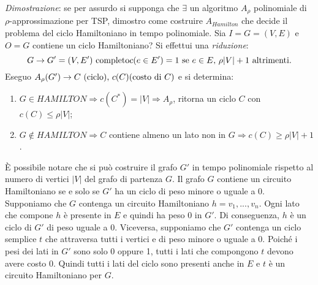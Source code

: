 \textit{Dimostrazione}: se per assurdo si supponga che $\exists$ un algoritmo $A_\rho$
polinomiale di $\rho$-approssimazione per TSP, dimostro come costruire $A_{Hamilton}$
che decide il problema del ciclo Hamiltoniano in tempo polinomiale. Sia $I = G =(V,E)$
e $O = G$ contiene un ciclo Hamiltoniano? Si effettui una \textit{riduzione}:
\[
    G \rightarrow G' = (V, E') \textnormal{ completo}
    c(e \in E') = 1 \textnormal{ se } e \in E \textnormal{, } \rho|V| + 1 \textnormal{ altrimenti.}
\]
Eseguo $A_\rho(G') \rightarrow C \textnormal{ (ciclo), } c(C) \textnormal{(costo di $C$)}$ e si
determina:
\begin{enumerate}
\item $G \in HAMILTON \Rightarrow c(C^*) = |V| \Rightarrow A_\rho$, ritorna un ciclo $C$
con $c(C) \le \rho|V|$;
\item $G \not\in HAMILTON \Rightarrow C$ contiene almeno un lato non in
$G \Rightarrow c(C) \ge \rho|V| + 1$.
\end{enumerate}

È possibile notare che si può costruire il grafo $G'$ in tempo polinomiale rispetto al numero
di vertici $|V|$ del grafo di partenza $G$. Il grafo $G$ contiene un circuito Hamiltoniano se e
solo se $G'$ ha un ciclo di peso minore o uguale a 0. Supponiamo che $G$ contenga un circuito
Hamiltoniano $h = v_1, ..., v_n$. Ogni lato che compone $h$ è presente in $E$ e quindi ha peso 0 in $G'$.
Di conseguenza, $h$ è un ciclo di $G'$ di peso uguale a 0. Viceversa, supponiamo che $G'$ contenga un ciclo
semplice $t$ che attraversa tutti i vertici e di peso minore o uguale a 0. Poiché i pesi dei lati
in $G'$ sono solo 0 oppure 1, tutti i lati che compongono $t$ devono avere costo 0. Quindi tutti i
lati del ciclo sono presenti anche in $E$ e $t$ è un circuito Hamiltoniano per $G$.
